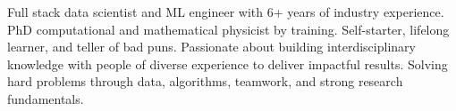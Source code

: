 

\begin{cvparagraph}

Full stack data scientist and ML engineer with 6+ years of industry experience. 
PhD computational and mathematical physicist by training. Self-starter, lifelong learner, and teller of bad puns. 
Passionate about building interdisciplinary knowledge with people of diverse experience to deliver impactful results. 
Solving hard problems through data, algorithms, teamwork, and strong research fundamentals. 
\end{cvparagraph}